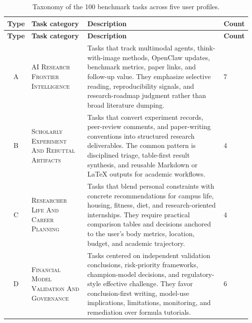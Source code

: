\documentclass{llmxive}
\begin{document}
{ %
\scriptsize
\begin{longtable}{cp{}p{}p{}}

\caption{Taxonomy of the 100 benchmark tasks across five user profiles.}
\label{tab:task_taxonomy} \\
\toprule[1.25pt]
\textbf{Type} & \textbf{Task category} & \textbf{Description} & \textbf{Count} \\
\midrule[0.75pt]
\endfirsthead

\toprule[1.25pt]
\textbf{Type} & \textbf{Task category} & \textbf{Description} & \textbf{Count} \\
\midrule[0.75pt]
\endhead

\endfoot

\bottomrule[1.25pt]
\endlastfoot

A &
\textsc{AI Research Frontier Intelligence} &
Tasks that track multimodal agents, think-with-image methods, OpenClaw updates, benchmark metrics, paper links, and follow-up value. They emphasize selective reading, reproducibility signals, and research-roadmap judgment rather than broad literature dumping. &
7 \\
\midrule[0.75pt]

B &
\textsc{Scholarly Experiment And Rebuttal Artifacts} &
Tasks that convert experiment records, peer-review comments, and paper-writing conventions into structured research deliverables. The common pattern is disciplined triage, table-first result synthesis, and reusable Markdown or LaTeX outputs for academic workflows. &
4 \\
\midrule[0.75pt]

C &
\textsc{Researcher Life And Career Planning} &
Tasks that blend personal constraints with concrete recommendations for campus life, housing, fitness, diet, and research-oriented internships. They require practical comparison tables and decisions anchored to the user's body metrics, location, budget, and academic trajectory. &
4 \\
\midrule[0.75pt]

D &
\textsc{Financial Model Validation And Governance} &
Tasks centered on independent validation conclusions, risk-priority frameworks, champion-model decisions, and regulatory-style effective challenge. They favor conclusion-first writing, model-use implications, limitations, monitoring, and remediation over formula tutorials. &
6 \\
\midrule[0.75pt]


\end{longtable}}
\end{document}
